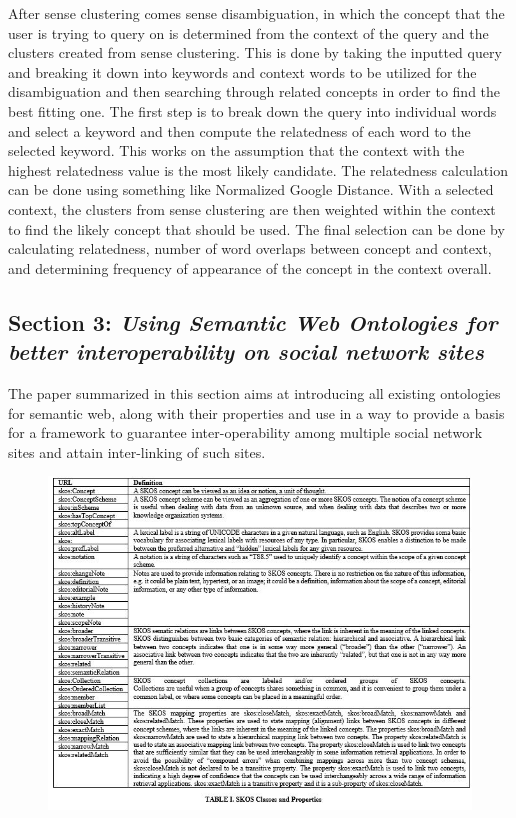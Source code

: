 \documentclass[10pt,journal,compsoc]{IEEEtran}
\begin{document}
After sense clustering comes sense disambiguation, in which the concept that the user is trying to query on is determined from the context of the query and the clusters created from sense clustering. This is done by taking the inputted query and breaking it down into keywords and context words to be utilized for the disambiguation and then searching through related concepts in order to find the best fitting one. The first step is to break down the query into individual words and select a keyword and then compute the relatedness of each word to the selected keyword. This works on the assumption that the context with the highest relatedness value is the most likely candidate. The relatedness calculation can be done using something like Normalized Google Distance. With a selected context, the clusters from sense clustering are then weighted within the context to find the likely concept that should be used. The final selection can be done by calculating relatedness, number of word overlaps between concept and context, and determining frequency of appearance of the concept in the context overall.




\subsection{Section 3: \textit{Using Semantic Web Ontologies for better interoperability on social network sites} \cite{6190504}}
The paper summarized in this section aims at introducing all existing ontologies for semantic web, along with their properties and use in a way to provide a basis for a framework to guarantee inter-operability among multiple social network sites and attain inter-linking of such sites.

\begin{figure}[hbt]
\begin{center}
\includegraphics[width=6in]{DanielaTable1.JPG}       
\label{fig1}
\end{center}
\end{figure}
\end{document}

